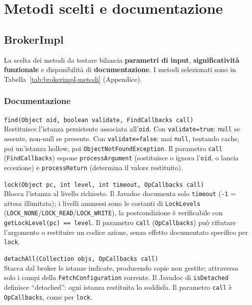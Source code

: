 \section{Metodi scelti e documentazione}

\subsection{BrokerImpl}

La scelta dei metodi da testare bilancia \textbf{parametri di input}, \textbf{significatività
funzionale} e disponibilità di \textbf{documentazione}. I metodi selezionati sono in Tabella~\ref{tab:brokerimpl-metodi} (Appendice).

\subsubsection{Documentazione}
\label{sec:brokerimpl-analisi-doc}

\texttt{find(Object oid, boolean validate, FindCallbacks call)}\\[6pt]
Restituisce l'istanza persistente associata all'\texttt{oid}. Con \texttt{validate=true}:
\texttt{null} se assente, non-null se presente. Con \texttt{validate=false}: mai \texttt{null},
tentando cache, poi un'istanza hollow, poi \texttt{ObjectNotFoundException}. Il parametro
\texttt{call} (\texttt{FindCallbacks}) espone \texttt{processArgument} (sostituisce o ignora
l'\texttt{oid}, o lancia eccezione) e \texttt{processReturn} (determina il valore restituito).

\bigskip
\texttt{lock(Object pc, int level, int timeout, OpCallbacks call)}\\[6pt]
Blocca l'istanza al livello richiesto. Il Javadoc documenta solo \texttt{timeout}
(\texttt{-1} = attesa illimitata); i livelli ammessi sono le costanti di \texttt{LockLevels}
(\texttt{LOCK\_NONE}/\texttt{LOCK\_READ}/\texttt{LOCK\_WRITE}), la postcondizione è verificabile
con \texttt{getLockLevel(pc) == level}. Il parametro \texttt{call} (\texttt{OpCallbacks}) può
rifiutare l'argomento o restituire un codice azione, senza effetto documentato specifico per
\texttt{lock}.

\bigskip
\texttt{detachAll(Collection objs, OpCallbacks call)}\\[6pt]
Stacca dal broker le istanze indicate, producendo copie non gestite; attraversa solo i campi
della \texttt{FetchConfiguration} corrente. Il Javadoc di \texttt{isDetached} definisce
``detached'': ogni istanza restituita lo soddisfa. Il parametro \texttt{call} è
\texttt{OpCallbacks}, come per \texttt{lock}.

